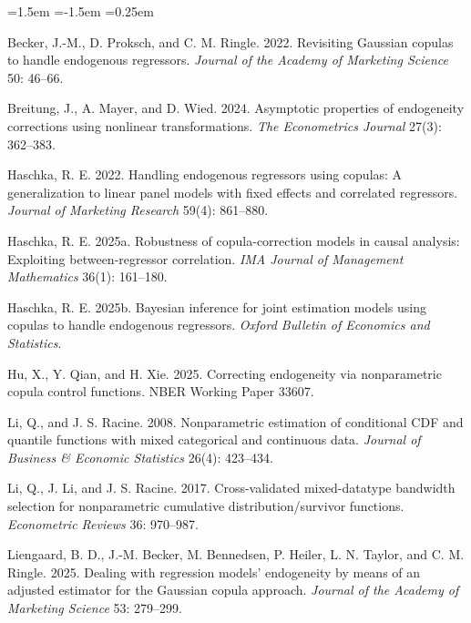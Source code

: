 \documentclass[11pt]{article}
\begin{document}
\small
\begin{list}{}{\leftmargin=1.5em \itemindent=-1.5em \itemsep=0.25em}

\item Becker, J.-M., D. Proksch, and C. M. Ringle. 2022. Revisiting Gaussian
copulas to handle endogenous regressors. \emph{Journal of the Academy of
Marketing Science} 50: 46--66.

\item Breitung, J., A. Mayer, and D. Wied. 2024. Asymptotic properties of
endogeneity corrections using nonlinear transformations. \emph{The
Econometrics Journal} 27(3): 362--383.

\item Haschka, R. E. 2022. Handling endogenous regressors using copulas: A
generalization to linear panel models with fixed effects and correlated
regressors. \emph{Journal of Marketing Research} 59(4): 861--880.

\item Haschka, R. E. 2025a. Robustness of copula-correction models in causal
analysis: Exploiting between-regressor correlation. \emph{IMA Journal of
Management Mathematics} 36(1): 161--180.

\item Haschka, R. E. 2025b. Bayesian inference for joint estimation models
using copulas to handle endogenous regressors. \emph{Oxford Bulletin of
Economics and Statistics}.

\item Hu, X., Y. Qian, and H. Xie. 2025. Correcting endogeneity via
nonparametric copula control functions. NBER Working Paper 33607.

\item Li, Q., and J. S. Racine. 2008. Nonparametric estimation of conditional
CDF and quantile functions with mixed categorical and continuous data.
\emph{Journal of Business \& Economic Statistics} 26(4): 423--434.

\item Li, Q., J. Li, and J. S. Racine. 2017. Cross-validated mixed-datatype
bandwidth selection for nonparametric cumulative distribution/survivor
functions. \emph{Econometric Reviews} 36: 970--987.

\item Liengaard, B. D., J.-M. Becker, M. Bennedsen, P. Heiler, L. N. Taylor,
and C. M. Ringle. 2025. Dealing with regression models' endogeneity by means
of an adjusted estimator for the Gaussian copula approach. \emph{Journal of
the Academy of Marketing Science} 53: 279--299.


\end{list}
\end{document}
